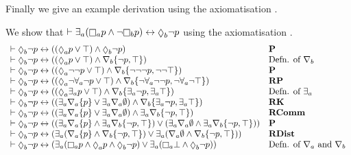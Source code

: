 \pagebreak

Finally we give an example derivation using the axiomatisation \axiomRmlK{}.

\begin{example}\label{rml-k-example-derivation}
We show that $\proves \somerefsA (\necessaryA \atomP \land \lnot \necessaryB \atomP) \iff \possibleB \lnot \atomP$ using the axiomatisation \axiomRmlK{}.
$$
\begin{array}{ll}
    \proves \possibleB \lnot \atomP \iff ((\possibleA \atomP \lor \top) \land \possibleB \lnot \atomP) & {\bf P}\\
    \proves \possibleB \lnot \atomP \iff ((\possibleA \atomP \lor \top) \land \coversB \{\lnot \atomP, \top\}) & \text{Defn. of $\coversB$}\\
    \proves \possibleB \lnot \atomP \iff ((\possibleA \lnot \lnot \atomP \lor \top) \land \coversB \{\lnot \lnot \lnot \atomP, \lnot \lnot \top\}) & {\bf P}\\
    \proves \possibleB \lnot \atomP \iff ((\possibleA \lnot \allrefsA \lnot \atomP \lor \top) \land \coversB \{\lnot \allrefsA \lnot \lnot \atomP, \lnot \allrefsA \lnot \top\}) & {\bf RP}\\
    \proves \possibleB \lnot \atomP \iff ((\possibleA \somerefsA \atomP \lor \top) \land \coversB \{\somerefsA \lnot \atomP, \somerefsA \top\}) & \text{Defn. of $\somerefsA$}\\
    \proves \possibleB \lnot \atomP \iff ((\somerefsA \coversA \{\atomP\} \lor \somerefsA \coversA \emptyset) \land \coversB \{\somerefsA \lnot \atomP, \somerefsA \top\}) & {\bf RK}\\
    \proves \possibleB \lnot \atomP \iff ((\somerefsA \coversA \{\atomP\} \lor \somerefsA \coversA \emptyset) \land \somerefsA \coversB \{\lnot \atomP, \top\}) & {\bf RComm}\\
    \proves \possibleB \lnot \atomP \iff ((\somerefsA \coversA \{\atomP\} \land \somerefsA \coversB \{\lnot \atomP, \top\}) \lor (\somerefsA \coversA \emptyset \land \somerefsA \coversB \{\lnot \atomP, \top\})) & {\bf P}\\
    \proves \possibleB \lnot \atomP \iff (\somerefsA (\coversA \{\atomP\} \land \coversB \{\lnot \atomP, \top\}) \lor \somerefsA (\coversA \emptyset \land \coversB \{\lnot \atomP, \top\})) & {\bf RDist}\\
    \proves \possibleB \lnot \atomP \iff (\somerefsA (\necessaryA \atomP \land \possibleA \atomP \land \possibleB \lnot \atomP) \lor \somerefsA (\necessaryA \bot \land \possibleB \lnot \atomP)) & \text{Defn. of $\coversA$ and $\coversB$}\\

\end{array}$$
\end{example}
